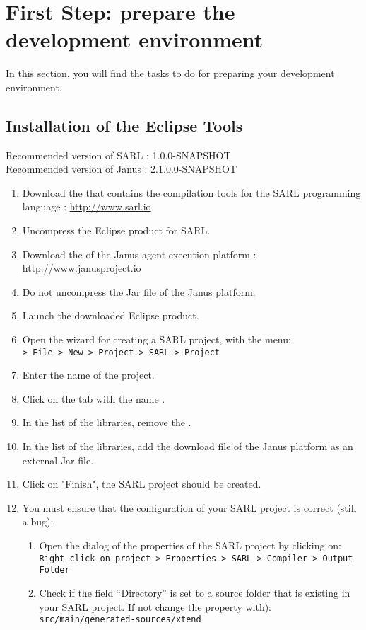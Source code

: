 \section{First Step: prepare the development environment}

In this section, you will find the tasks to do for preparing your development environment.

\subsection{Installation of the Eclipse Tools}

\begin{emphbox}
Recommended version of SARL : 1.0.0-SNAPSHOT \\
Recommended version of Janus : 2.1.0.0-SNAPSHOT
\end{emphbox}

\begin{enumerate}
\item Download the  that contains the compilation tools for the SARL programming language : \url{http://www.sarl.io}
\item Uncompress the Eclipse product for SARL.
\item Download the  of the Janus agent execution platform : \url{http://www.janusproject.io}
\item Do not uncompress the Jar file of the Janus platform.
\item Launch the downloaded Eclipse product.
\item Open the wizard for creating a SARL project, with the menu: \\
	\texttt{> File > New > Project > SARL > Project}
\item Enter the name of the project.
\item Click on the tab with the name .
\item In the list of the libraries, remove the .
\item In the list of the libraries, add the download file of the Janus platform as an external Jar file.
\item Click on "Finish", the SARL project should be created.
\item You must ensure that the configuration of your SARL project is correct (still a bug):
	\begin{enumerate}[a]
	\item Open the dialog of the properties of the SARL project by clicking on: \\
		\texttt{Right click on project > Properties > SARL > Compiler > Output Folder}
	\item Check if the field ``Directory'' is set to a source folder that is existing in your SARL project. If not change the property with): \\
		\texttt{src/main/generated-sources/xtend}
	\end{enumerate}
\end{enumerate}

